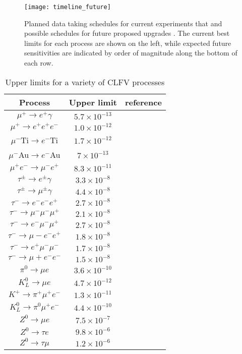 \documentclass[12pt,a4paper,openright, oneside, titlepage]{book} %
\begin{document}
\begin{figure}[h!]
\centering
\texttt{[image: timeline\_future]}
\caption{Planned data taking schedules for current experiments that and possible schedules for future proposed upgrades \cite{Baldini:2019}. The current best limits for each process are shown on the left, while expected future sensitivities are indicated by order of magnitude along the bottom of each row.}
\label{_timeline_future}
\end{figure}

\begin{table}[!h]
\centering
\begin{tabular}{c|c|c}
\hline
Process & Upper limit & reference\\
\hline
\hline
$\mu^+\rightarrow e^+\gamma$ & $5.7\times 10^{-13}$ & \cite{MEG}\\
$\mu^+\rightarrow e^+e^+e^-$ & $1.0\times 10^{-12}$ & \cite{SINDRUM}\\
$\mu^-$Ti$\rightarrow e^-$Ti  & $1.7\times 10^{-12}$ & \cite{SINDRUM}\\
$\mu^-$Au$\rightarrow e^-$Au  & $7\times 10^{-13}$   & \cite{Bertl}\\
$\mu^+e^-\rightarrow \mu^-e^+$ & $8.3\times 10^{-11}$ & \cite{Willmann}\\
$\tau^\pm\rightarrow e^\pm\gamma$ & $3.3\times 10^{-8}$ & \cite{Aubert}\\
$\tau^\pm\rightarrow \mu^\pm\gamma$ & $4.4\times 10^{-8}$ & \cite{Aubert}\\
$\tau^-\rightarrow e^-e^-e^+$ & $2.7\times 10^{-8}$ & \cite{Hayasaka}\\
$\tau^-\rightarrow \mu^-\mu^-\mu^+$ & $2.1\times 10^{-8}$ & \cite{Hayasaka}\\
$\tau^-\rightarrow e^-\mu^-\mu^+$ & $2.7\times 10^{-8}$ & \cite{Hayasaka}\\
$\tau^-\rightarrow \mu-e^-e^+$ & $1.8\times 10^{-8}$ & \cite{Hayasaka}\\
$\tau^-\rightarrow e^+\mu^-\mu^-$ & $1.7\times 10^{-8}$ & \cite{Hayasaka}\\
$\tau^-\rightarrow \mu+e^-e^-$ & $1.5\times 10^{-8}$ & \cite{Hayasaka}\\
$\pi^0\rightarrow \mu e$ & $3.6\times 10^{-10}$ & \cite{Abouzaid}\\
$K^0_L\rightarrow \mu e$ & $4.7\times 10^{-12}$ & \cite{Ambrose}\\
$K^+\rightarrow \pi^+\mu^+e^-$ & $1.3\times 10^{-11}$ & \cite{Sher}\\
$K^0_L\rightarrow \pi^0\mu^+e^-$ & $4.4\times 10^{-10}$ & \cite{Abouzaid}\\
$Z^0\rightarrow \mu e$ & $7.5\times10^{-7}$& \cite{Aad}\\
$Z^0\rightarrow \tau e$ & $9.8\times10^{-6}$& \cite{Akers} \\
$Z^0\rightarrow \tau \mu$ & $1.2\times10^{-6}$& \cite{Akers}\\
\hline
\end{tabular}
\caption{Upper limits for a variety of CLFV processes}
\label{T_CLFV}
\end{table}
\end{document}
